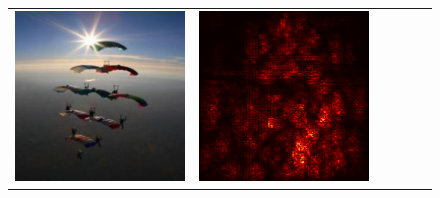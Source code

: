 \documentclass[preprint,12pt]{elsarticle}
\begin{document}
\begin{figure}[p]
\begin{tabular}{cccccc}
  \includegraphics[scale=\scale]{../visualizations/examples/imagenette/cnn/images/8.png} &
  \includegraphics[scale=\scale]{../visualizations/examples/imagenette/cnn/saliency_map/8.png} & 

\end{tabular}
\end{figure}
\end{document}
